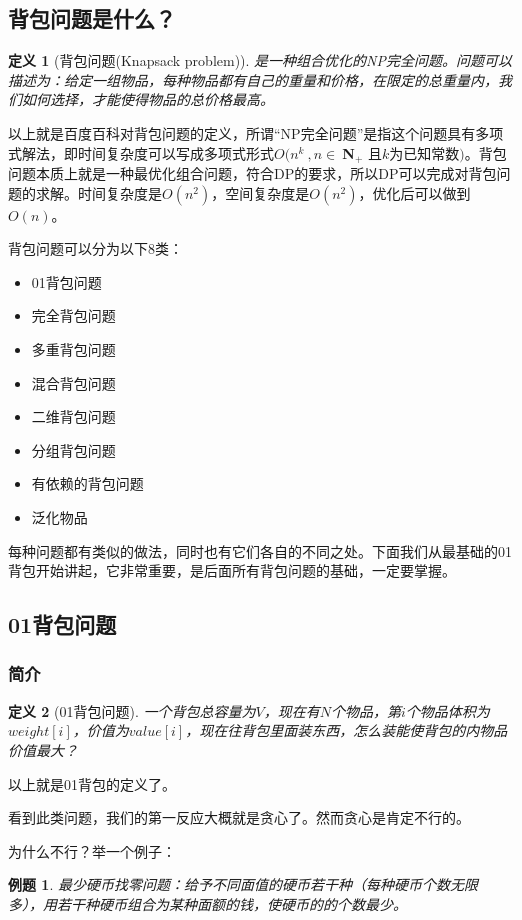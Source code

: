 \documentclass{article}
\newtheorem{example}{例题}[subsection]
\newtheorem{definition}{定义}[subsection]
\theoremstyle{nonumberplain}
\begin{document}
\subsection{背包问题是什么？}
\begin{definition}[背包问题(Knapsack problem)]是一种组合优化的NP完全问题。问题可以描述为：给定一组物品，每种物品都有自己的重量和价格，在限定的总重量内，我们如何选择，才能使得物品的总价格最高。
\end{definition}

以上就是百度百科对背包问题的定义，所谓“NP完全问题”是指这个问题具有多项式解法，即时间复杂度可以写成多项式形式$O(n^k\ , n \in\ $\textbf{N}$_+$
且$k$为已知常数$)$。背包问题本质上就是一种最优化组合问题，符合DP的要求，所以DP可以完成对背包问题的求解。时间复杂度是$O(n^2)$，空间复杂度是$O(n^2)$，优化后可以做到$O(n)$。

背包问题可以分为以下8类：
\begin{itemize}
	\item{01背包问题}
	\item{完全背包问题}
	\item{多重背包问题}
	\item{混合背包问题}
	\item{二维背包问题}
	\item{分组背包问题}
	\item{有依赖的背包问题}
	\item{泛化物品}
\end{itemize}

每种问题都有类似的做法，同时也有它们各自的不同之处。下面我们从最基础的01背包开始讲起，它非常重要，是后面所有背包问题的基础，一定要掌握。

\subsection{01背包问题}
\subsubsection{简介}
\begin{definition}[01背包问题]一个背包总容量为$V$，现在有$N$个物品，第$i$个物品体积为$weight[i]$，价值为$value[i]$，现在往背包里面装东西，怎么装能使背包的内物品价值最大？\end{definition}

以上就是\rm{01}背包的定义了。

看到此类问题，我们的第一反应大概就是贪心了。然而贪心是肯定不行的。

为什么不行？举一个例子：
\begin{example}最少硬币找零问题：给予不同面值的硬币若干种（每种硬币个数无限多），用若干种硬币组合为某种面额的钱，使硬币的的个数最少。\end{example}
\end{document}
